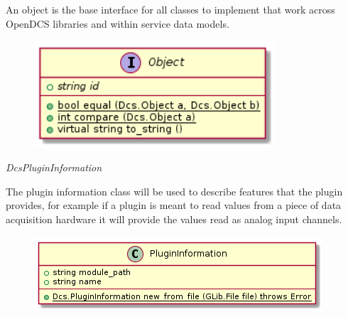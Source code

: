       \vspace*{-0.75cm}
      \begin{minipage}[t]{0.5\textwidth}
        \vspace*{0.5cm}
        An object is the base interface for all classes to implement that work
        across OpenDCS libraries and within service data models.
      \end{minipage} \hfill
      \begin{minipage}[t]{0.45\textwidth}
        \begin{figure}[H]
          \includegraphics[width=0.8\textwidth]{figures/design/class/core/object}
          \label{fig:dsg-classes-object}
        \end{figure}
      \end{minipage}

      \emph{DcsPluginInformation}

      \vspace*{-0.75cm}
      \begin{minipage}[t]{0.5\textwidth}
        \vspace*{0.5cm}
        The plugin information class will be used to describe features that the
        plugin provides, for example if a plugin is meant to read values from a
        piece of data acquisition hardware it will provide the values read as
        analog input channels.
      \end{minipage} \hfill
      \begin{minipage}[t]{0.45\textwidth}
        \begin{figure}[H]
          \includegraphics[width=\textwidth]{figures/design/class/core/plugin-information}
          \label{fig:dsg-classes-plugin-information}
        \end{figure}
      \end{minipage}

